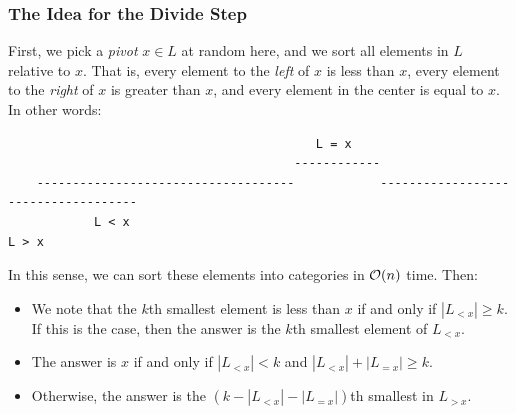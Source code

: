 \documentclass[letterpaper]{article}
\begin{document}
\subsubsection{The Idea for the Divide Step}
First, we pick a \emph{pivot} $x \in L$ at random here, and we sort all elements in $L$ relative to $x$. That is, every element to the \emph{left} of $x$ is less than $x$, every element to the \emph{right} of $x$ is greater than $x$, and every element in the center is equal to $x$. In other words: 
\begin{verbatim}
                                           L = x
                                        ------------
    ------------------------------------            ------------------------------------
            L < x                                                         L > x
\end{verbatim}
In this sense, we can sort these elements into categories in $\mathcal{O}(n)$ time. Then: 
\begin{itemize}
    \item We note that the $k$th smallest element is less than $x$ if and only if $|L_{< x}| \geq k$. If this is the case, then the answer is the $k$th smallest element of $L_{< x}$. 
    \item The answer is $x$ if and only if $|L_{< x}| < k$ and $|L_{< x}| + |L_{= x}| \geq k$.
    \item Otherwise, the answer is the $(k - |L_{< x}| - |L_{= x}|)$th smallest in $L_{> x}$. 
\end{itemize}
\end{document}
